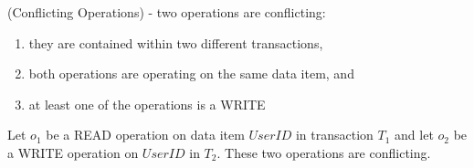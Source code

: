 %  
%  

\begin{definition}
\label{conflict_ops}
 (Conflicting Operations) - two operations are conflicting:

 \begin{enumerate}
   \item they are contained within two different transactions,
   \item both operations are operating on the same data item, and
   \item at least one of the operations is a WRITE
 \end{enumerate}

 \begin{example}
 \label{ex_conflict_ops}
  Let $o_{1}$ be a READ operation on data item $User ID$ in transaction $T_{1}$ and let $o_{2}$ be a WRITE operation on $User ID$ in $T_{2}$. These two operations are conflicting.
 \end{example}
\end{definition}

 
 

